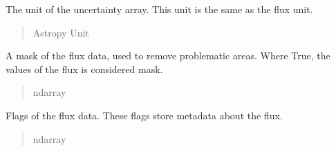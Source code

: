 \documentclass[letterpaper,11pt,english]{sphinxmanual}
\begin{document}
\begin{savenotes}
\begin{fulllineitems}
\begin{savenotes}\begin{fulllineitems}
\label{\detokenize{code/lezargus.container.cube:lezargus.container.cube.LezargusCube.uncertainty_unit}}
\pysigstartsignatures
{}
\pysigstopsignatures
\sphinxAtStartPar
The unit of the uncertainty array. This unit is the same as the flux
unit.
\begin{quote}\begin{description}
\sphinxAtStartPar
Astropy Unit

\end{description}\end{quote}

\end{fulllineitems}\end{savenotes}


\begin{savenotes}\begin{fulllineitems}
\label{\detokenize{code/lezargus.container.cube:lezargus.container.cube.LezargusCube.mask}}
\pysigstartsignatures
{}
\pysigstopsignatures
\sphinxAtStartPar
A mask of the flux data, used to remove problematic areas. Where True,
the values of the flux is considered mask.
\begin{quote}\begin{description}
\sphinxAtStartPar
ndarray

\end{description}\end{quote}

\end{fulllineitems}\end{savenotes}


\begin{savenotes}\begin{fulllineitems}
\label{\detokenize{code/lezargus.container.cube:lezargus.container.cube.LezargusCube.flags}}
\pysigstartsignatures
{}
\pysigstopsignatures
\sphinxAtStartPar
Flags of the flux data. These flags store metadata about the flux.
\begin{quote}\begin{description}
\sphinxAtStartPar
ndarray


\end{description}
\end{quote}
\end{fulllineitems}
\end{savenotes}
\end{fulllineitems}
\end{savenotes}
\end{document}

